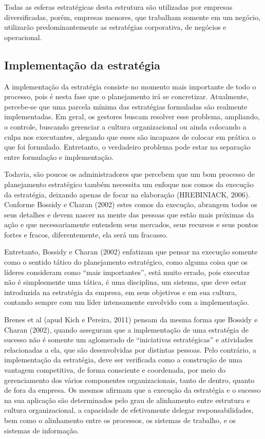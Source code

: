\documentclass[
	12pt,				%
	openright,			%
	oneside,			%
	a4paper,			%
	english,			%
	french,				%
	spanish,			%
	brazil				%
	]{abntex2}
\begin{document}
	Todas as esferas estratégicas desta estrutura são utilizadas por empresas diversificadas, porém, empresas menores, que trabalham somente em um negócio, utilizarão predominantemente as estratégias corporativa, de negócios e operacional.	
		
\subsection[Implementação da estratégia]{Implementação da estratégia}

	A implementação da estratégia consiste no momento mais importante de todo o processo, pois é nesta fase que o planejamento irá se concretizar. Atualmente, percebe-se que uma parcela mínima das estratégias formuladas são realmente implementadas. Em geral, os gestores buscam resolver esse problema, ampliando, o controle, buscando gerenciar a cultura organizacional ou ainda colocando a culpa nos executantes, alegando que esses são incapazes de colocar em prática o que foi formulado. Entretanto, o verdadeiro problema pode estar na separação entre formulação e implementação.
	
	Todavia, são poucos os administradores que percebem que um bom processo de planejamento estratégico também necessita um enfoque nos comos da execução da estratégia, deixando apenas de focar na elaboração (HREBINIACK, 2006). 
Conforme Bossidy e Charan (2002) estes comos da execução, abrangem todos os seus detalhes e devem nascer na mente das pessoas que estão mais próximas da ação e que necessariamente entendem seus mercados, seus recursos e seus pontos fortes e fracos, diferentemente, ela será um fracasso.

	Entretanto, Bossidy e Charan (2002) enfatizam que pensar na execução somente como o sentido tático do planejamento estratégico, como alguma coisa que os líderes consideram como “mais importantes”, está muito errado, pois executar não é simplesmente uma tática, é uma disciplina, um sistema, que deve estar introduzida na estratégia da empresa, em seus objetivos e em sua cultura, contando sempre com um líder intensamente envolvido com a implementação. 
	
	Brenes et al (apud Kich e Pereira, 2011) pensam da mesma forma que Bossidy e Charan (2002), quando asseguram que a implementação de uma estratégia de sucesso não é somente um aglomerado de “iniciativas estratégicas” e atividades relacionadas a ela, que são desenvolvidas por distintas pessoas. Pelo contrário, a implementação da estratégia, deve ser verificada como a construção de uma vantagem competitiva, de forma consciente e coordenada, por meio do gerenciamento dos vários componentes organizacionais, tanto de dentro, quanto de fora da empresa. Os mesmos afirmam que a execução da estratégia e o sucesso na sua aplicação são determinados pelo grau de alinhamento entre estrutura e cultura organizacional, a capacidade de efetivamente delegar responsabilidades, bem como o alinhamento entre os processos, os sistemas de trabalho, e os sistemas de informação.
	
\end{document}
